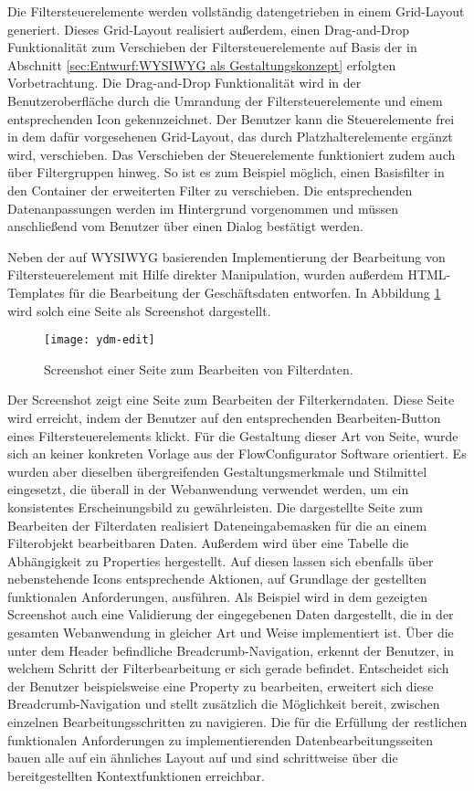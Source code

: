 Die Filtersteuerelemente werden vollständig datengetrieben in einem Grid-Layout generiert. Dieses Grid-Layout realisiert außerdem, einen Drag-and-Drop Funktionalität zum Verschieben der Filtersteuerelemente auf Basis der in Abschnitt \ref{sec:Entwurf:WYSIWYG als Gestaltungskonzept} erfolgten Vorbetrachtung. Die Drag-and-Drop Funktionalität wird in der Benutzeroberfläche durch die Umrandung der Filtersteuerelemente und einem entsprechenden Icon gekennzeichnet. Der Benutzer kann die Steuerelemente frei in dem dafür vorgesehenen Grid-Layout, das durch Platzhalterelemente ergänzt wird, verschieben. Das Verschieben der Steuerelemente funktioniert zudem auch über Filtergruppen hinweg. So ist es zum Beispiel möglich, einen Basisfilter in den Container der erweiterten Filter zu verschieben. Die entsprechenden Datenanpassungen werden im Hintergrund vorgenommen und müssen anschließend vom Benutzer über einen Dialog bestätigt werden.  

Neben der auf WYSIWYG basierenden Implementierung der Bearbeitung von Filtersteuerelement mit Hilfe direkter Manipulation, wurden außerdem HTML-Templates für die Bearbeitung der Geschäftsdaten entworfen. In Abbildung \ref{fig:editpage} wird solch eine Seite als Screenshot dargestellt.
\begin{figure}[H]
\centering
\texttt{[image: ydm-edit]} %
\caption{Screenshot einer Seite zum Bearbeiten von Filterdaten.}
\label{fig:editpage}
\end{figure}
Der Screenshot zeigt eine Seite zum Bearbeiten der Filterkerndaten. Diese Seite wird erreicht, indem der Benutzer auf den entsprechenden Bearbeiten-Button eines Filtersteuerelements klickt. Für die Gestaltung dieser Art von Seite, wurde sich an keiner konkreten Vorlage aus der FlowConfigurator Software orientiert. Es wurden aber dieselben übergreifenden Gestaltungsmerkmale und Stilmittel eingesetzt, die überall in der Webanwendung verwendet werden, um ein konsistentes Erscheinungsbild zu gewährleisten. Die dargestellte Seite zum Bearbeiten der Filterdaten realisiert Dateneingabemasken für die an einem Filterobjekt bearbeitbaren Daten. Außerdem wird über eine Tabelle die Abhängigkeit zu Properties hergestellt. Auf diesen lassen sich ebenfalls über nebenstehende Icons entsprechende Aktionen, auf Grundlage der gestellten funktionalen Anforderungen, ausführen. Als Beispiel wird in dem gezeigten Screenshot auch eine Validierung der eingegebenen Daten dargestellt, die in der gesamten Webanwendung in gleicher Art und Weise implementiert ist. Über die unter dem Header befindliche Breadcrumb-Navigation, erkennt der Benutzer, in welchem Schritt der Filterbearbeitung er sich gerade befindet. Entscheidet sich der Benutzer beispielsweise eine Property zu bearbeiten, erweitert sich diese Breadcrumb-Navigation und stellt zusätzlich die Möglichkeit bereit, zwischen einzelnen Bearbeitungsschritten zu navigieren. Die für die Erfüllung der restlichen funktionalen Anforderungen zu implementierenden Datenbearbeitungsseiten bauen alle auf ein ähnliches Layout auf und sind schrittweise über die bereitgestellten Kontextfunktionen erreichbar.
